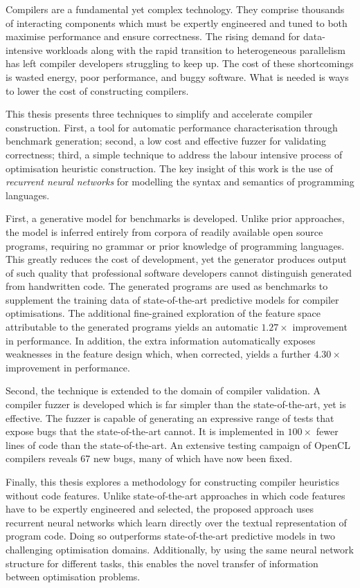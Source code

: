 Compilers are a fundamental yet complex technology. They comprise thousands of interacting components which must be expertly engineered and tuned to both maximise performance and ensure correctness. The rising demand for data-intensive workloads along with the rapid transition to heterogeneous parallelism has left compiler developers struggling to keep up. The cost of these shortcomings is wasted energy, poor performance, and buggy software. What is needed is ways to lower the cost of constructing compilers.

This thesis presents three techniques to simplify and accelerate compiler construction. First, a tool for automatic performance characterisation through benchmark generation; second, a low cost and effective fuzzer for validating correctness; third, a simple technique to address the labour intensive process of optimisation heuristic construction. The key insight of this work is the use of \emph{recurrent neural networks} for modelling the syntax and semantics of programming languages.

First, a generative model for benchmarks is developed. Unlike prior approaches, the model is inferred entirely from corpora of readily available open source programs, requiring no grammar or prior knowledge of programming languages. This greatly reduces the cost of development, yet the generator produces output of such quality that professional software developers cannot distinguish generated from handwritten code. The generated programs are used as benchmarks to supplement the training data of state-of-the-art predictive models for compiler optimisations. The additional fine-grained exploration of the feature space attributable to the generated programs yields an automatic $1.27\times$ improvement in performance. In addition, the extra information automatically exposes weaknesses in the feature design which, when corrected, yields a further $4.30\times$ improvement in performance.

Second, the technique is extended to the domain of compiler validation. A compiler fuzzer is developed which is far simpler than the state-of-the-art, yet is effective. The fuzzer is capable of generating an expressive range of tests that expose bugs that the state-of-the-art cannot. It is implemented in $100\times$ fewer lines of code than the state-of-the-art. An extensive testing campaign of OpenCL compilers reveals 67 new bugs, many of which have now been fixed.

Finally, this thesis explores a methodology for constructing compiler heuristics without code features. Unlike state-of-the-art approaches in which code features have to be expertly engineered and selected, the proposed approach uses recurrent neural networks which learn directly over the textual representation of program code. Doing so outperforms state-of-the-art predictive models in two challenging optimisation domains. Additionally, by using the same neural network structure for different tasks, this enables the novel transfer of information between optimisation problems.
